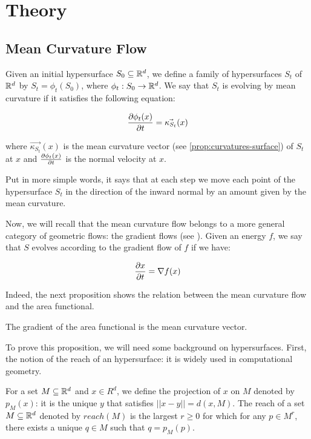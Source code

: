 \chapter{Theory}
\label{chapter:theory}

\section{Mean Curvature Flow}

Given an initial hypersurface $ S_0 \subseteq \mathbb{R}^d $, we define a  family of
hypersurfaces $ S_t $ of $ \mathbb{R}^d $ by $ S_t = \phi_t(S_0) $, where $ \phi_t : S_0
\to \mathbb{R}^d $. We say that $ S_t $ is evolving by mean curvature if it satisfies
the following equation:

$$ \frac{\partial{\phi_t(x)}}{\partial{t}} = \vec{\kappa_{S_t}}(x) $$

where $ \vec{\kappa_{S_t}}(x) $ is the mean curvature vector (see
\ref{prop:curvatures-surface}) of $ S_t $ at $ x $ and
$ \frac{\partial{\phi_t(x)}}{\partial{t}} $ is the normal velocity at $ x $.

Put in more simple words, it says that at each step we move each point of the
hypersurface $ S_t $ in the direction of the inward normal by an amount given by
the mean curvature.

Now, we will recall that the mean curvature flow belongs to a more general
category of geometric flows: the gradient flows (see
\cite{ilmanen1998lectures}). Given an energy $ f $, we say that $ S $ evolves
according to the gradient flow of $ f $ if we have:

$$ \frac{\partial{x}}{\partial{t}} = \nabla f(x) $$

Indeed, the next proposition shows the relation between the mean curvature flow
and the area functional.

\begin{proposition}
    The gradient of the area functional is the mean curvature vector.
    \label{prop:gradient-area-functional}
\end{proposition}

To prove this proposition, we will need some background on hypersurfaces. First,
the notion of the reach of an hypersurface: it is widely used in computational
geometry.

\begin{definition}
    For a set $ M \subseteq \mathbb{R}^d $ and $ x \in R^d $, we define the projection
    of $ x $ on $ M $ denoted by $ p_M(x) $: it is the unique $ y $ that
    satisfies $ || x - y || = d(x, M) $. The reach of a set $ M \subseteq \mathbb{R}^d $
    denoted by $ reach(M) $ is the largest $ r \geq 0 $ for which for any $ p
    \in M^r $, there exists a unique $ q \in M $ such that $ q = p_M(p) $.
\end{definition}

